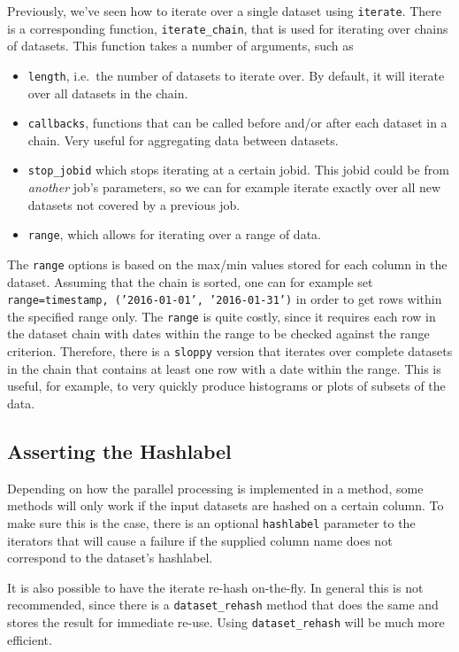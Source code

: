 Previously, we've seen how to iterate over a single dataset using
\texttt{iterate}.  There is a corresponding function,
\texttt{iterate\_chain}, that is used for iterating over chains of
datasets.  This function takes a number of arguments, such as
\begin{itemize}
\item[] \texttt{length}, i.e.\ the number of datasets to iterate over.
  By default, it will iterate over all datasets in the chain.
\item[] \texttt{callbacks}, functions that can be called before and/or
  after each dataset in a chain.  Very useful for aggregating data
  between datasets.
\item[] \texttt{stop\_jobid} which stops iterating at a certain jobid.
  This jobid could be from \textsl{another} job's parameters, so we
  can for example iterate exactly over all new datasets not covered by
  a previous job.

\item[] \texttt{range}, which allows for iterating over a range of
  data.
\end{itemize}
The \texttt{range} options is based on the max/min values stored for
each column in the dataset.  Assuming that the chain is sorted, one
can for example set \texttt{range={timestamp, ('2016-01-01', '2016-01-31')}}
in order to get rows within the specified range only.  The %
\texttt{range} is quite costly, since it requires each row in the
dataset chain with dates within the range to be checked against the
range criterion.  Therefore, there is a \texttt{sloppy} version that
iterates over complete datasets in the chain that contains at least
one row with a date within the range.  This is useful, for example, to
very quickly produce histograms or plots of subsets of the data.


\subsection{Asserting the Hashlabel}
Depending on how the parallel processing is implemented in a method,
some methods will only work if the input datasets are hashed on a
certain column.  To make sure this is the case, there is an optional
\texttt{hashlabel} parameter to the iterators that will cause a
failure if the supplied column name does not correspond to the
dataset's hashlabel.



It is also possible to have the iterate re-hash on-the-fly.  In
general this is not recommended, since there is a
\texttt{dataset\_rehash} method that does the same and stores the
result for immediate re-use.  Using \texttt{dataset\_rehash} will be
much more efficient.

